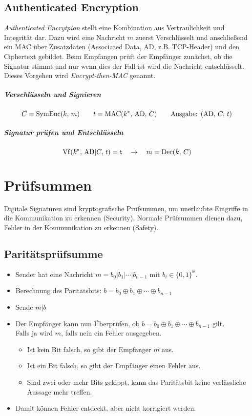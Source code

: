 		\subsection{Authenticated Encryption}
			\textit{Authenticated Encrytpion} stellt eine Kombination aus Vertraulichkeit und Integrität dar. Dazu wird eine Nachricht \(m\) zuerst Verschlüsselt und anschließend ein MAC über Zusatzdaten (Associated Data, AD, z.B. TCP-Header) und den Ciphertext gebildet. Beim Empfangen prüft der Empfänger zunächst, ob die Signatur stimmt und nur wenn dies der Fall ist wird die Nachricht entschlüsselt. Dieses Vorgehen wird \textit{Encrypt-then-MAC} genannt.

			\subparagraph{Verschlüsseln und Signieren}
				\begin{equation*}
					C = \text{SymEnc}(k,\, m) \qquad t = \operatorname{MAC}(k^*,\, \textrm{AD},\, C) \qquad \textrm{Ausgabe: } (\textrm{AD},\, C,\, t)
				\end{equation*}

			\subparagraph{Signatur prüfen und Entschlüsseln}
				\begin{equation*}
					\operatorname{Vf}(k^*,\, \textrm{AD} \vert C,\, t) = \mathfrak{t} \quad\rightarrow\quad m = \operatorname{Dec}(k,\, C)
				\end{equation*}

	\section{Prüfsummen}
		Digitale Signaturen sind kryptografische Prüfsummen, um unerlaubte Eingriffe in die Kommunikation zu erkennen (Security). Normale Prüfsummen dienen dazu, Fehler in der Kommunikation zu erkennen (Safety).

		\subsection{Paritätsprüfsumme}
			\begin{itemize}
				\item Sender hat eine Nachricht \( m = b_0 \vert b_1 \vert \cdots \vert b_{n - 1} \) mit \( b_i \in \{0,1\}^\mathbb{B} \).
				\item Berechnung des Paritätsbits: \( b = b_0 \oplus b_1 \oplus \cdots \oplus b_{n-1} \)
				\item Sende \( m \vert b \)
				\item Der Empfänger kann nun Überprüfen, ob \( b = b_0 \oplus b_1 \oplus \cdots \oplus b_{n-1} \) gilt. \\ Falls ja wird \(m\), falls nein ein Fehler ausgegeben.
					\begin{itemize}
						\item Ist kein Bit falsch, so gibt der Empfänger \(m\) aus.
						\item Ist ein Bit falsch, so gibt der Empfänger einen Fehler aus.
						\item Sind zwei oder mehr Bits gekippt, kann das Paritätsbit keine verlässliche Aussage mehr treffen.
					\end{itemize}
				\item Damit können Fehler entdeckt, aber nicht korrigiert werden.
			\end{itemize}

